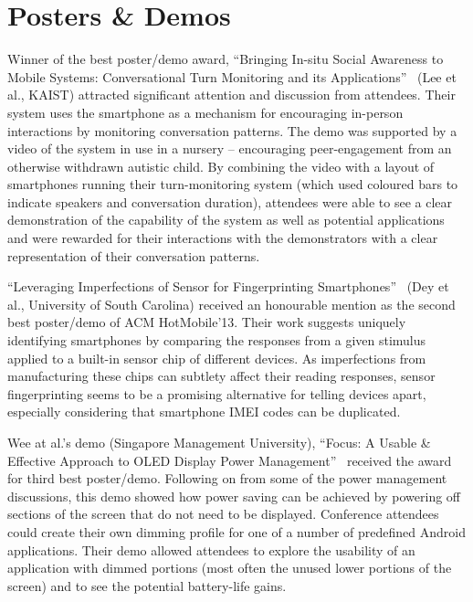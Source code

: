 \section{Posters \& Demos}
\label{sec:postersdemos}
Winner of the best poster\slash demo award, ``Bringing In-situ Social Awareness to Mobile 
Systems: Conversational Turn Monitoring and its
Applications''~\cite{lee13} (Lee et al., 
KAIST) attracted significant attention and discussion from attendees. Their 
system uses the smartphone as a mechanism for encouraging in-person interactions
by monitoring conversation patterns. The demo was supported by a video of the 
system in use in a nursery -- encouraging peer-engagement from an otherwise 
withdrawn autistic child. By combining the video with a layout of smartphones 
running their turn-monitoring system (which used coloured bars to indicate 
speakers and conversation duration), attendees were able to see a clear 
demonstration of the capability of the system as well as potential applications
and were rewarded for their interactions with the demonstrators with a clear
representation of their conversation patterns.

``Leveraging Imperfections of Sensor for Fingerprinting
Smartphones''~\cite{dey13}
(Dey et al., University of South Carolina) received an honourable mention
as the second best poster\slash demo of ACM HotMobile'13. Their work suggests
uniquely identifying smartphones by comparing the responses from a given
stimulus applied to a built-in sensor chip of different devices. As
imperfections from manufacturing these chips can subtlety affect their
reading responses, sensor fingerprinting seems to be a promising
alternative for telling devices apart, especially considering that
smartphone IMEI codes can be duplicated.

Wee at al.'s demo (Singapore Management University), ``Focus: A Usable \&
Effective Approach to OLED Display Power Management''~\cite{wee13}
received the award
for third best poster\slash demo. Following on from some of the power
management discussions, this demo showed how power saving can be achieved
by powering off sections of the screen that do not need to be displayed.
Conference attendees could create their own dimming profile for one of a
number of predefined Android applications. Their demo allowed attendees to
explore the usability of an application with dimmed portions (most often
the unused lower portions of the screen) and to see the potential
battery-life gains.
